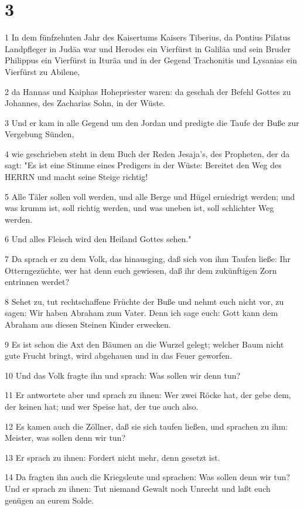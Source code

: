 \chapter{3}

\par 1 In dem fünfzehnten Jahr des Kaisertums Kaisers Tiberius, da Pontius Pilatus Landpfleger in Judäa war und Herodes ein Vierfürst in Galiläa und sein Bruder Philippus ein Vierfürst in Ituräa und in der Gegend Trachonitis und Lysanias ein Vierfürst zu Abilene,
\par 2 da Hannas und Kaiphas Hohepriester waren: da geschah der Befehl Gottes zu Johannes, des Zacharias Sohn, in der Wüste.
\par 3 Und er kam in alle Gegend um den Jordan und predigte die Taufe der Buße zur Vergebung Sünden,
\par 4 wie geschrieben steht in dem Buch der Reden Jesaja's, des Propheten, der da sagt: "Es ist eine Stimme eines Predigers in der Wüste: Bereitet den Weg des HERRN und macht seine Steige richtig!
\par 5 Alle Täler sollen voll werden, und alle Berge und Hügel erniedrigt werden; und was krumm ist, soll richtig werden, und was uneben ist, soll schlichter Weg werden.
\par 6 Und alles Fleisch wird den Heiland Gottes sehen."
\par 7 Da sprach er zu dem Volk, das hinausging, daß sich von ihm Taufen ließe: Ihr Otterngezüchte, wer hat denn euch gewiesen, daß ihr dem zukünftigen Zorn entrinnen werdet?
\par 8 Sehet zu, tut rechtschaffene Früchte der Buße und nehmt euch nicht vor, zu sagen: Wir haben Abraham zum Vater. Denn ich sage euch: Gott kann dem Abraham aus diesen Steinen Kinder erwecken.
\par 9 Es ist schon die Axt den Bäumen an die Wurzel gelegt; welcher Baum nicht gute Frucht bringt, wird abgehauen und in das Feuer geworfen.
\par 10 Und das Volk fragte ihn und sprach: Was sollen wir denn tun?
\par 11 Er antwortete aber und sprach zu ihnen: Wer zwei Röcke hat, der gebe dem, der keinen hat; und wer Speise hat, der tue auch also.
\par 12 Es kamen auch die Zöllner, daß sie sich taufen ließen, und sprachen zu ihm: Meister, was sollen denn wir tun?
\par 13 Er sprach zu ihnen: Fordert nicht mehr, denn gesetzt ist.
\par 14 Da fragten ihn auch die Kriegsleute und sprachen: Was sollen denn wir tun? Und er sprach zu ihnen: Tut niemand Gewalt noch Unrecht und laßt euch genügen an eurem Solde.
